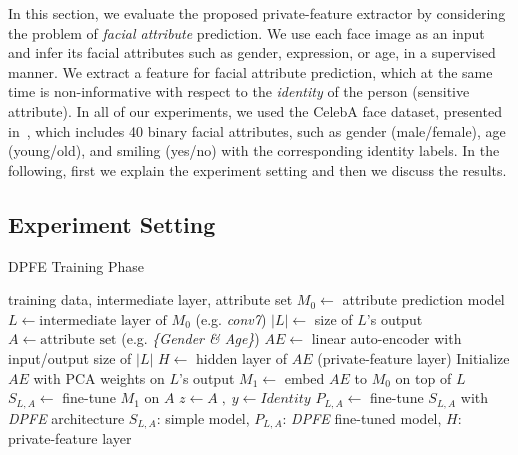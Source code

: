 \documentclass[10pt,journal,compsoc]{IEEEtran}
\begin{document}
In this section, we evaluate the proposed private-feature extractor by considering the problem of \emph{facial attribute} prediction. We use each face image as an input and infer its facial attributes such as gender, expression, or age, in a supervised manner. We extract a feature for facial attribute prediction, which at the same time is non-informative with respect to the \emph{identity} of the person (sensitive attribute). In all of our experiments, we used the CelebA face dataset, presented in~\cite{liu2015}, which includes 40 binary facial attributes, such as gender (male/female), age (young/old), and smiling (yes/no) with the corresponding identity labels. In the following, first we explain the experiment setting and then we discuss the results.

\subsection{Experiment Setting}\begin{algorithm}[t] 
	\caption{DPFE Training Phase}
	\label{alg:train}
	\begin{algorithmic}
		\REQUIRE training data, intermediate layer, attribute set %
		\STATE $M_0 \leftarrow$ attribute prediction model
		\STATE $L \leftarrow \text{intermediate layer of } M_0$ (e.g. \emph{conv7})
		\STATE $|L| \leftarrow$ size of $L$'s output
		\STATE $A \leftarrow \text{attribute set}$ (e.g. \emph{\{Gender \& Age\}})
		\STATE $AE \leftarrow$ linear auto-encoder with input/output size of $|L|$
		\STATE $H \leftarrow$ hidden layer of $AE$ (private-feature layer)
		\STATE Initialize $AE$ with PCA weights on $L$'s output 
		\STATE $M_1 \leftarrow$ embed $AE$ to $M_0$ on top of $L$
		\STATE $S_{L,A} \leftarrow$ fine-tune $M_1$ on $A$
		\STATE $z \leftarrow A\;,\; y \leftarrow Identity$
		\STATE $P_{L,A} \leftarrow$ fine-tune $S_{L,A}$ with \emph{DPFE} architecture
		\ENSURE $S_{L,A}$: simple model, $P_{L,A}$: \emph{DPFE} fine-tuned model, $H$: private-feature layer
	\end{algorithmic}
\end{algorithm}
\end{document}
